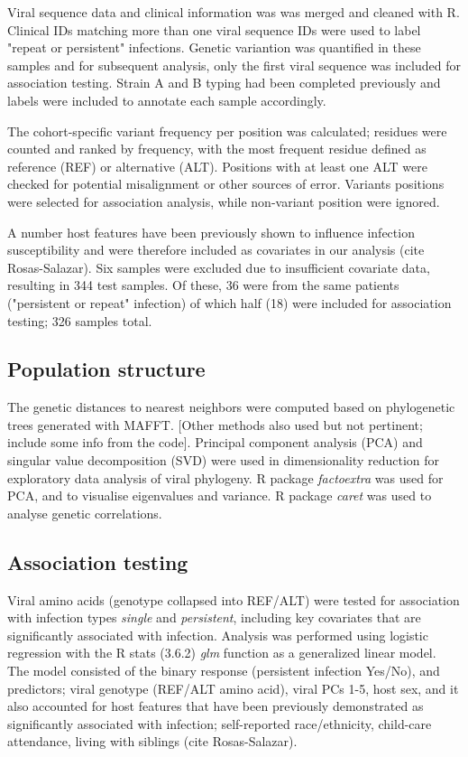 \documentclass{article}
\begin{document}
Viral sequence data and clinical information was was merged and cleaned with R.
Clinical IDs matching more than one viral sequence IDs were used to label "repeat or persistent" infections. 
Genetic variantion was quantified in these samples and for subsequent analysis, only the first viral sequence was included for association testing. 
Strain A and B typing had been completed previously and labels were included to annotate each sample accordingly.

The cohort-specific variant frequency per position was calculated;
residues were counted and ranked by frequency,
with the most frequent residue defined as reference (REF) or alternative (ALT).
Positions with at least one ALT were checked for potential misalignment or other sources of error. 
Variants positions were selected for association analysis, while non-variant position were ignored.

A number host features have been previously shown to influence infection susceptibility and were therefore included as covariates in our analysis (cite Rosas-Salazar).
Six samples were excluded due to insufficient covariate data, resulting in 344 test samples. 
Of these, 36 were from the same patients ("persistent or repeat" infection) of which half (18) were included for association testing; 326 samples total.


\subsection{Population structure}
The genetic distances to nearest neighbors were computed based on phylogenetic 
trees generated with MAFFT.
[Other methods also used but not pertinent; include some info from the code].
Principal component analysis (PCA) and singular value decomposition (SVD) were used in dimensionality reduction for exploratory data analysis of viral phylogeny.
R package \textit{factoextra} was used for PCA, and to visualise eigenvalues and variance. 
R package \textit{caret} was used to analyse genetic correlations.

\subsection{Association testing}
Viral amino acids (genotype collapsed into REF/ALT) were tested for association with infection types \textit{single} and \textit{persistent}, 
including key covariates that are significantly associated with infection.
Analysis was performed using logistic regression with the
R stats (3.6.2) \textit{glm} function as a generalized linear model.
The model consisted of the binary response (persistent infection Yes/No), and predictors; viral genotype (REF/ALT amino acid), viral PCs 1-5, host sex, and it also accounted for host features that have been previously demonstrated as significantly associated with infection; 
self-reported race/ethnicity, child-care attendance, living with siblings (cite Rosas-Salazar).
\end{document}
